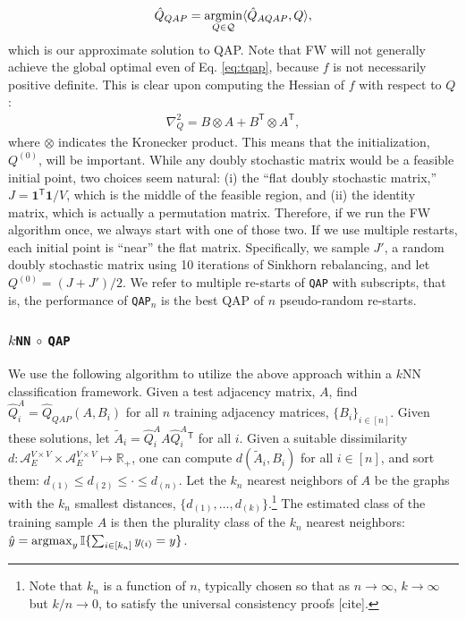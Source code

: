 \documentclass{article} %
\providecommand{\ve}[1]{\boldsymbol{#1}}
\newcommand{\argmax}{\operatornamewithlimits{argmax}}
\newcommand{\argmin}{\operatornamewithlimits{argmin}}
\newcommand{\T}{^{\ensuremath{\mathsf{T}}}}           %
\newcommand{\II}{\mathbb{I}}           %
\providecommand{\mc}[1]{\mathcal{#1}}
\providecommand{\mh}[1]{\hat{#1}}
\providecommand{\mt}[1]{\widetilde{#1}}
\newcommand{\Real}{\mathbb{R}}
\newcommand{\conv}{\rightarrow}
\newcommand{\qap}{\texttt{QAP} }
\newcommand{\qapn}{\texttt{QAP$_n$} }
\begin{document}
\begin{align}
	\mh{Q}_{QAP} = \argmin_{Q \in \mc{Q}} \langle \mh{Q}_{AQAP}, Q \rangle,
\end{align}
which is our approximate solution to QAP.  Note that FW will not generally achieve the global optimal even of Eq. \eqref{eq:tqap}, because $f$ is not necessarily positive definite.  This is clear upon computing the Hessian of $f$  with respect to $Q$:
\begin{align}
	\nabla_Q^2  =  B \otimes A + B\T \otimes A\T,
\end{align}
where $\otimes$ indicates the Kronecker product. This means that the initialization, $Q^{(0)}$, will be important.  While any doubly stochastic matrix would be a feasible initial point, two choices seem natural: (i) the ``flat doubly  stochastic matrix,'' $J=\ve{1}\T \ve{1}/V$, which is the middle of the feasible region, and (ii) the identity matrix, which is actually a permutation matrix.  Therefore, if we run the FW algorithm once, we always start with one of those two.  If we use multiple restarts, each initial point is ``near'' the flat matrix.  Specifically, we sample $J'$, a random doubly stochastic matrix using 10 iterations of Sinkhorn rebalancing, and let $Q^{(0)}=(J+J')/2$.  We refer to multiple re-starts of \qap with subscripts, that is, the performance of \qapn is the best QAP of $n$ pseudo-random re-starts.  



\subsubsection{\texttt{$k$NN} $\circ$ \qap} %
\label{ssub:_k_nn_circ_qap}


We use the following algorithm to utilize the above approach within a $k$NN classification framework.  Given a test adjacency matrix, $A$, find $\mh{Q}_i^A=\mh{Q}_{QAP}(A,B_i)$ for all $n$ training adjacency matrices, $\{B_i\}_{i \in [n]}$.  Given these solutions, let $\mt{A}_i=\mh{Q}_i^A A {\mh{Q}_i^A}{}\T$ for all $i$. Given a suitable dissimilarity $d: \mc{A}_E^{V\times V} \times \mc{A}_E^{V\times V} \mapsto \Real_+$, one can compute $d(\mt{A}_i,B_i)$ for all $i \in [n]$, and sort them: $d_{(1)} \leq d_{(2)} \leq \cdot \leq d_{(n)}$.  Let the $k_n$ nearest neighbors of $A$ be the graphs with the $k_n$ smallest distances, $\{d_{(1)},\ldots, d_{(k)}\}$.\footnote{Note that $k_n$ is a function of $n$, typically chosen so that as $n \conv \infty$, $k \conv \infty$ but $k/n \conv 0$, to satisfy the universal consistency proofs [cite].}  The estimated class of the training sample $A$ is then the plurality class of the $k_n$ nearest neighbors: $\mh{y}=\argmax_{y} \II\{\sum_{i \in [k_n]} y_{(i)} = y \}$.
\end{document}

